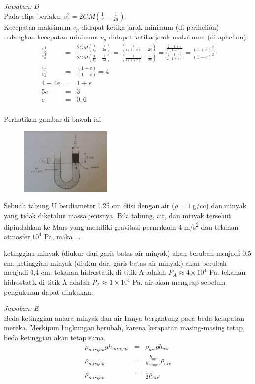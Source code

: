 \documentclass[11pt,fleqn]{exam}
\begin{document}
\begin{questions}
\textit{Jawaban: D}\\
Pada elips berlaku: $v_r^2=2GM\left(\frac{1}{r}-\frac{1}{2a}\right)$.\\
Kecepatan maksimum $v_p$ didapat ketika jarak minimum (di perihelion) sedangkan kecepatan minimum $v_a$ didapat ketika jarak maksimum (di aphelion).
\begin{eqnarray*}
\frac{v_p^2}{v_a^2}&=&\frac{2GM\left(\frac{1}{r_p}-\frac{1}{2a}\right)}{2GM\left(\frac{1}{r_a}-\frac{1}{2a}\right)} = \frac{\left(\frac{1}{a(1-e)}-\frac{1}{2a}\right)}{\left(\frac{1}{a(1+e)}-\frac{1}{2a}\right)} = \frac{\frac{2-1+e}{2(1-e)}}{\frac{2-1-e}{2(1+e)}} = \frac{(1+e)^2}{(1-e)^2} \\
\frac{v_p}{v_a}&=&\frac{(1+e)}{(1-e)} = 4 \\
4-4e&=&1+e \\
5e&=&3 \\
e&=&0,6\\
\end{eqnarray*}


\question Perhatikan gambar di bawah ini:
\begin{figure}[H]
\centering
\includegraphics[width=0.4\textwidth]{gambar/tabung.png}
\end{figure}
\noindent Sebuah tabung U berdiameter 1,25 cm diisi dengan air ($\rho=1$ g/cc) dan minyak yang tidak diketahui massa jenisnya. Bila tabung, air, dan minyak tersebut dipindahkan ke Mars yang memiliki gravitasi permukaan 4 m/s\textsuperscript{2} dan tekanan atmosfer $10^4$ Pa, maka ...
\begin{choices}
\choice ketinggian minyak (diukur dari garis batas air-minyak) akan berubah menjadi 0,5 cm.
\choice ketinggian minyak (diukur dari garis batas air-minyak) akan berubah menjadi 0,4 cm.
\choice tekanan hidrostatik di titik A adalah $P_A\approx 4\times 10^4$ Pa.
\choice tekanan hidrostatik di titik A adalah $P_A\approx 1\times 10^4$ Pa.
\choice air akan menguap sebelum pengukuran dapat dilakukan.
\end{choices}

\textit{Jawaban: E} \\
Beda ketinggian antara minyak dan air hanya bergantung pada beda kerapatan mereka. Meskipun lingkungan berubah, karena kerapatan masing-masing tetap, beda ketinggian akan tetap sama.
\begin{eqnarray*}
\rho_{minyak}gh_{minyak}&=&\rho_{air}gh_{air} \\
\rho_{minyak}&=&\frac{h_{air}}{h_{minyak}}\rho_{air} \\
\rho_{minyak}&=&\frac{1}{2}\rho_{air}.
\end{eqnarray*}


\end{questions}
\end{document}
